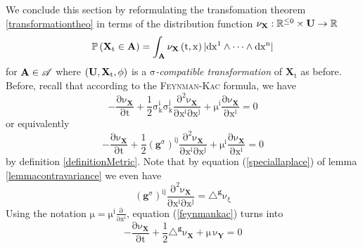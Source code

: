 \documentclass[10 pt,english]{smfart}
\newcommand{\Xt}{\mathrm{\mathbf{X}}_{t}}
\newcommand{\X}{\mathrm{\mathbf{X}}}
\newcommand{\Y}{\mathrm{\mathbf{Y}}}
\newcommand{\g}{\mathrm{\mathbf{g}}}
\newcommand{\U}{{\bf{U}}}
\newcommand{\A}{{\bf{A}}}
\begin{document}
We conclude this section by reformulating the transfomation theorem \ref{transformationtheo} in terms of the distribution function $\mathrm{\nu_{\X}:\mathbb{R}^{\leq 0}\times \U\rightarrow \mathbb{R}}$
\begin{equation}
\mathrm{\mathbb{P}\left(\Xt\in \A\right)=\int_{\A}\nu_{\X}\left(t,x\right)\vert dx^{1}\wedge \dots\wedge dx^{n}\vert}
\end{equation}
for $\mathrm{\A\in\mathscr{A}}$ where $\mathrm{(\U,\Xt,\phi)}$ is a $\mathrm{\sigma}$\textit{-compatible transformation} of $\mathrm{\Xt}$ as before. Before, recall that according to the {\scshape{Feynman-Kac}} formula, we have 
\begin{equation}\label{feynmankac}
\mathrm{-\frac{\partial \nu_{\X}}{\partial t}+\frac{1}{2}\sigma_{k}^{i}\sigma^{j}_{k}\frac{\partial^{2}\nu_{\X}}{\partial x^{i}\partial x^{j}}+\mu^{i}\frac{\partial \nu_{\X}}{\partial x^{i}}=0}
\end{equation} or equivalently 
\begin{equation}
\mathrm{-\frac{\partial \nu_{\X}}{\partial t}+\frac{1}{2}\left(\g^{\sigma}\right)^{ij}\frac{\partial^{2}\nu_{\X}}{\partial x^{i}\partial x^{j}}+\mu^{i}\frac{\partial \nu_{\X}}{\partial x^{i}}=0}
\end{equation} by definition \ref{definitionMetric}. Note that by equation (\ref{speciallaplace}) of lemma \ref{lemmacontravariance} we even have 
\begin{equation}
\mathrm{\left(\g^{\sigma}\right)^{ij}\frac{\partial^{2}\nu_{\X}}{\partial x^{i}\partial x^{j}}=\triangle^{\g}\nu_{\xi}}
\end{equation} Using the notation $\mathrm{\mu=\mu^{i}\frac{\partial}{\partial x^{i}}}$, equation (\ref{feynmankac}) turns into 
\begin{equation}
\mathrm{-\frac{\partial \nu_{\X}}{\partial t}+\frac{1}{2}\triangle^{\g}\nu_{\X}+\mu\,\nu_{\Y}=0}
\end{equation}
\end{document}
